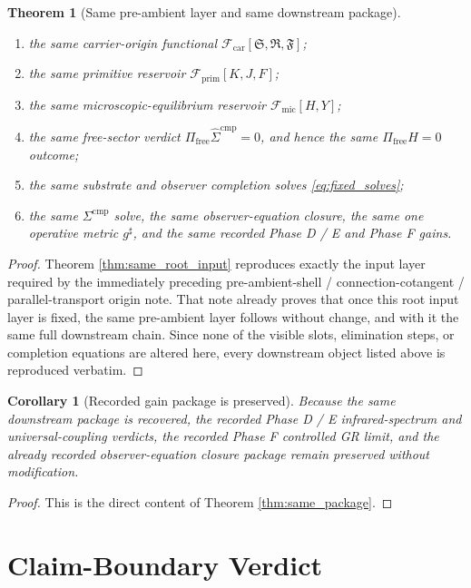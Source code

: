 \documentclass[11pt]{article}
\newcommand{\CompletedMetric}{g^{\sharp}}
\newcommand{\CompLift}{\widehat\Sigma^{\mathrm{cmp}}}
\newcommand{\FreeProj}{\Pi_{\mathrm{free}}}
\newcommand{\GaugeAux}{Y}
\newcommand{\MicFunctional}{\mathscr F_{\mathrm{mic}}}
\newcommand{\PrimFunctional}{\mathscr F_{\mathrm{prim}}}
\newcommand{\CarrierFunctional}{\mathscr F_{\mathrm{car}}}
\newcommand{\PrimStrain}{K}
\newcommand{\PrimNeutral}{J}
\newcommand{\PrimFree}{F}
\newcommand{\CarrierSeed}{\mathfrak S}
\newcommand{\RelabelSeed}{\mathfrak R}
\newcommand{\FreeSeed}{\mathfrak F}
\newtheorem{corollary}{Corollary}
\newtheorem{theorem}{Theorem}
\begin{document}
\begin{theorem}[Same pre-ambient layer and same downstream package]
\begin{enumerate}
    \item the same carrier-origin functional \(\CarrierFunctional[\CarrierSeed,\RelabelSeed,\FreeSeed]\);
    \item the same primitive reservoir \(\PrimFunctional[\PrimStrain,\PrimNeutral,\PrimFree]\);
    \item the same microscopic-equilibrium reservoir \(\MicFunctional[H,\GaugeAux]\);
    \item the same free-sector verdict \(\FreeProj\CompLift=0\), and hence the same \(\Pi_{\mathrm{free}}H=0\) outcome;
    \item the same substrate and observer completion solves \eqref{eq:fixed_solves};
    \item the same \(\Sigma^{\mathrm{cmp}}\) solve, the same observer-equation closure, the same one operative metric \(\CompletedMetric\), and the same recorded Phase D / E and Phase F gains.
\end{enumerate}
\end{theorem}

\begin{proof}
Theorem \ref{thm:same_root_input} reproduces exactly the input layer required by the immediately preceding pre-ambient-shell / connection-cotangent / parallel-transport origin note. That note already proves that once this root input layer is fixed, the same pre-ambient layer follows without change, and with it the same full downstream chain. Since none of the visible slots, elimination steps, or completion equations are altered here, every downstream object listed above is reproduced verbatim.
\end{proof}

\begin{corollary}[Recorded gain package is preserved]
\label{cor:gains}
Because the same downstream package is recovered, the recorded Phase D / E infrared-spectrum and universal-coupling verdicts, the recorded Phase F controlled GR limit, and the already recorded observer-equation closure package remain preserved without modification.
\end{corollary}

\begin{proof}
This is the direct content of Theorem \ref{thm:same_package}.
\end{proof}

\section{Claim-Boundary Verdict}
\end{document}
